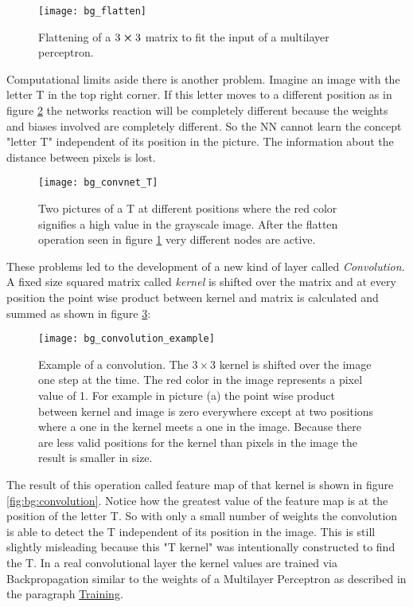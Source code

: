 \begin{figure}[H]
    \centering
    \texttt{[image: bg\_flatten]}
    \caption{Flattening of a $3\cp3$ matrix to fit the input of a multilayer perceptron.}
    \label{fig:bg:flatten}
\end{figure}

Computational limits aside there is another problem. Imagine an image with the letter T in the top right corner. If this letter moves to a different position as in figure \ref{fig:bg:convnet_T} the networks reaction will be completely different because the weights and biases involved are completely different. So the NN cannot learn the concept "letter T" independent of its position in the picture. The information about the distance between pixels is lost.

\begin{figure}[H]
    \centering
    \texttt{[image: bg\_convnet\_T]}
    \caption{Two pictures of a T at different positions where the red color signifies a high value in the grayscale image. After the flatten operation seen in figure \ref{fig:bg:flatten} very different nodes are active.}
    \label{fig:bg:convnet_T}
\end{figure}

These problems led to the development of a new kind of layer called \textit{Convolution}. A fixed size squared matrix called \textit{kernel} is shifted over the matrix and at every position the point wise product between kernel and matrix is calculated and summed as shown in figure \ref{fig:bg:conv_examp}:

\begin{figure}[H]
    \centering
    \texttt{[image: bg\_convolution\_example]}
    \caption{Example of a convolution. The $3 \times 3$ kernel is shifted over the image one step at the time. The red color in the image represents a pixel value of 1. For example in picture (a) the point wise product between kernel and image is zero everywhere except at two positions where a one in the kernel meets a one in the image. Because there are less valid positions for the kernel than pixels in the image the result is smaller in size.}
    \label{fig:bg:conv_examp}
\end{figure}


 The result of this operation called feature map of that kernel is shown in figure \ref{fig:bg:convolution}. Notice how the greatest value of the feature map is at the position of the letter T. So with only a small number of weights the convolution is able to detect the T independent of its position in the image.
 This is still slightly misleading because this "T kernel" was intentionally constructed to find the T. In a real convolutional layer the kernel values are trained via Backpropagation similar to the weights of a Multilayer Perceptron as described in the paragraph \hyperref[par:training]{Training}.


